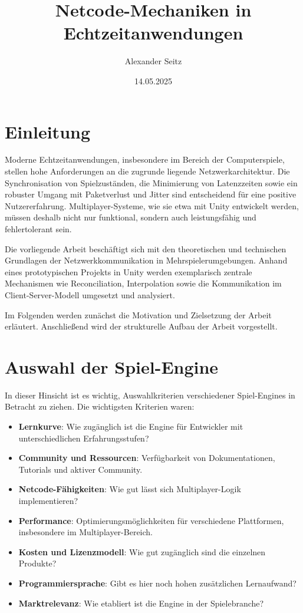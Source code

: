 \documentclass{article}
\title{\textbf{Netcode-Mechaniken in Echtzeitanwendungen}}
\author{Alexander Seitz }
\date{14.05.2025}
\begin{document}
\maketitle
\newpage

\tableofcontents
\newpage

\section{Einleitung}
Moderne Echtzeitanwendungen, insbesondere im Bereich der Computerspiele, stellen hohe Anforderungen an die zugrunde liegende Netzwerkarchitektur. Die Synchronisation von Spielzuständen, die Minimierung von Latenzzeiten sowie ein robuster Umgang mit Paketverlust und Jitter sind entscheidend für eine positive Nutzererfahrung. Multiplayer-Systeme, wie sie etwa mit Unity entwickelt werden, müssen deshalb nicht nur funktional, sondern auch leistungsfähig und fehlertolerant sein.

Die vorliegende Arbeit beschäftigt sich mit den theoretischen und technischen Grundlagen der Netzwerkkommunikation in Mehrspielerumgebungen. Anhand eines prototypischen Projekts in Unity werden exemplarisch zentrale Mechanismen wie Reconciliation, Interpolation sowie die Kommunikation im Client-Server-Modell umgesetzt und analysiert.

Im Folgenden werden zunächst die Motivation und Zielsetzung der Arbeit erläutert. Anschließend wird der strukturelle Aufbau der Arbeit vorgestellt.
\newpage
\section{Auswahl der Spiel-Engine}

In dieser Hinsicht ist es wichtig, Auswahlkriterien verschiedener Spiel-Engines in Betracht zu ziehen. Die wichtigsten Kriterien waren: 

\begin{itemize}
    \item \textbf{Lernkurve}: Wie zugänglich ist die Engine für Entwickler mit unterschiedlichen Erfahrungsstufen?
    \item \textbf{Community und Ressourcen}: Verfügbarkeit von Dokumentationen, Tutorials und aktiver Community.
    \item \textbf{Netcode-Fähigkeiten}: Wie gut lässt sich Multiplayer-Logik implementieren?
    \item \textbf{Performance}: Optimierungsmöglichkeiten für verschiedene Plattformen, insbesondere im Multiplayer-Bereich.
    \item \textbf{Kosten und Lizenzmodell}: Wie gut zugänglich sind die einzelnen Produkte?
    \item \textbf{Programmiersprache}: Gibt es hier noch hohen zusätzlichen Lernaufwand?
    \item \textbf{Marktrelevanz}: Wie etabliert ist die Engine in der Spielebranche?
\end{itemize}
\end{document}
